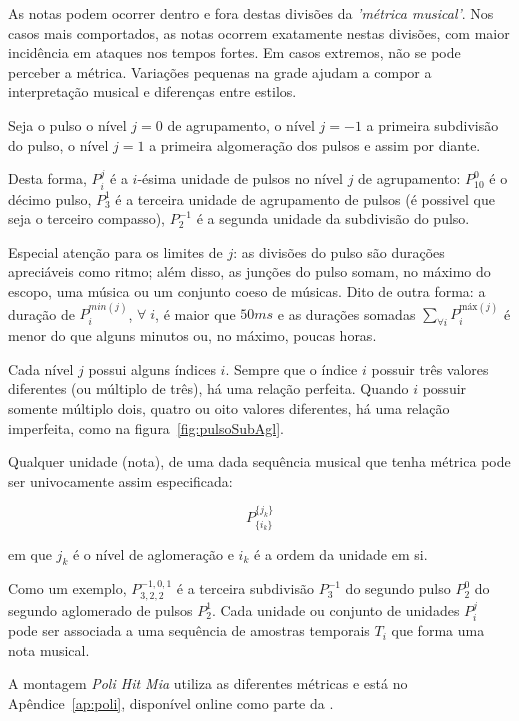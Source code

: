 As notas podem ocorrer dentro e fora destas divisões da \emph{'métrica musical'}. Nos casos mais comportados, as notas ocorrem exatamente nestas divisões, com maior incidência em ataques nos tempos fortes.
Em casos extremos, não se pode perceber a métrica.\cite{Roederer} Variações pequenas na grade ajudam a compor a interpretação musical e diferenças entre estilos.\cite{Cook}

Seja o pulso o nível $j=0$ de agrupamento, o nível $j=-1$ 
a primeira subdivisão do pulso, o nível $j=1$ a primeira algomeração dos pulsos e assim por diante. 

Desta forma, $P_i^j$ é a $i$-ésima unidade de 
pulsos no nível $j$ de agrupamento:
$P^0_{10}$ é o décimo pulso, $P^{1}_3$ é a terceira unidade de agrupamento de pulsos (é possivel que seja o terceiro compasso),
$P^{-1}_2$ é a segunda unidade da subdivisão do pulso.

Especial atenção para
os limites de $j$: as divisões do pulso são durações apreciáveis
como ritmo; além disso, as junções do pulso somam, no máximo
do escopo, uma música ou um conjunto coeso de músicas. Dito de outra forma: a duração de $P^{min(j)}_i$, $\forall \; i$,
é maior que $50ms$ e as durações somadas $\sum_{\forall i}P^{\text{máx}(j)}_i$
é menor do que alguns minutos ou, no máximo, poucas horas.


Cada nível $j$ possui alguns índices $i$. Sempre que o índice $i$ possuir três valores diferentes
(ou múltiplo de três), há uma relação perfeita. 
Quando $i$ possuir somente múltiplo dois, quatro ou oito valores diferentes, há uma relação imperfeita, como na figura~\ref{fig:pulsoSubAgl}.


Qualquer unidade (nota), de uma
dada sequência musical que tenha métrica pode ser
univocamente assim especificada:

\begin{equation}
P^{ \{ j_k \} }_{ \{ i_{k} \}}
\end{equation}

em que $j_k$ é o nível de aglomeração e $i_k$ é a ordem
da unidade em si.

Como um exemplo, $P^{-1,0,1}_{3,2,2}$  é a terceira subdivisão $P^{-1}_3$ do segundo
pulso $P^0_2$ do segundo aglomerado de pulsos $P^1_2$.
Cada unidade ou conjunto de unidades $P_i^j$ pode ser associada a uma sequência de amostras temporais $T_i$ que forma uma nota musical. 

A montagem \emph{Poli Hit Mia} utiliza as diferentes métricas e está no Apêndice~\ref{ap:poli}, disponível online como parte da \massa.

